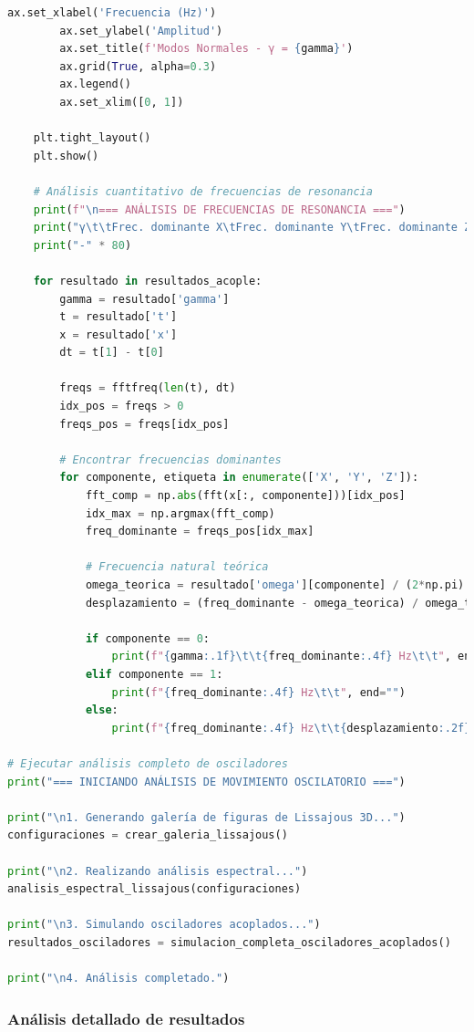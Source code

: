 \documentclass{article}
\begin{document}
\begin{lstlisting}[language=Python, caption={Análisis completo de figuras de Lissajous 3D y osciladores acoplados}]
        ax.set_xlabel('Frecuencia (Hz)')
        ax.set_ylabel('Amplitud')
        ax.set_title(f'Modos Normales - γ = {gamma}')
        ax.grid(True, alpha=0.3)
        ax.legend()
        ax.set_xlim([0, 1])
    
    plt.tight_layout()
    plt.show()
    
    # Análisis cuantitativo de frecuencias de resonancia
    print(f"\n=== ANÁLISIS DE FRECUENCIAS DE RESONANCIA ===")
    print("γ\t\tFrec. dominante X\tFrec. dominante Y\tFrec. dominante Z\tDesplazamiento")
    print("-" * 80)
    
    for resultado in resultados_acople:
        gamma = resultado['gamma']
        t = resultado['t']
        x = resultado['x']
        dt = t[1] - t[0]
        
        freqs = fftfreq(len(t), dt)
        idx_pos = freqs > 0
        freqs_pos = freqs[idx_pos]
        
        # Encontrar frecuencias dominantes
        for componente, etiqueta in enumerate(['X', 'Y', 'Z']):
            fft_comp = np.abs(fft(x[:, componente]))[idx_pos]
            idx_max = np.argmax(fft_comp)
            freq_dominante = freqs_pos[idx_max]
            
            # Frecuencia natural teórica
            omega_teorica = resultado['omega'][componente] / (2*np.pi)
            desplazamiento = (freq_dominante - omega_teorica) / omega_teorica * 100
            
            if componente == 0:
                print(f"{gamma:.1f}\t\t{freq_dominante:.4f} Hz\t\t", end="")
            elif componente == 1:
                print(f"{freq_dominante:.4f} Hz\t\t", end="")
            else:
                print(f"{freq_dominante:.4f} Hz\t\t{desplazamiento:.2f}%")

# Ejecutar análisis completo de osciladores
print("=== INICIANDO ANÁLISIS DE MOVIMIENTO OSCILATORIO ===")

print("\n1. Generando galería de figuras de Lissajous 3D...")
configuraciones = crear_galeria_lissajous()

print("\n2. Realizando análisis espectral...")
analisis_espectral_lissajous(configuraciones)

print("\n3. Simulando osciladores acoplados...")
resultados_osciladores = simulacion_completa_osciladores_acoplados()

print("\n4. Análisis completado.")
	\end{lstlisting}

	\subsubsection{Análisis detallado de resultados}
	
\end{document}
